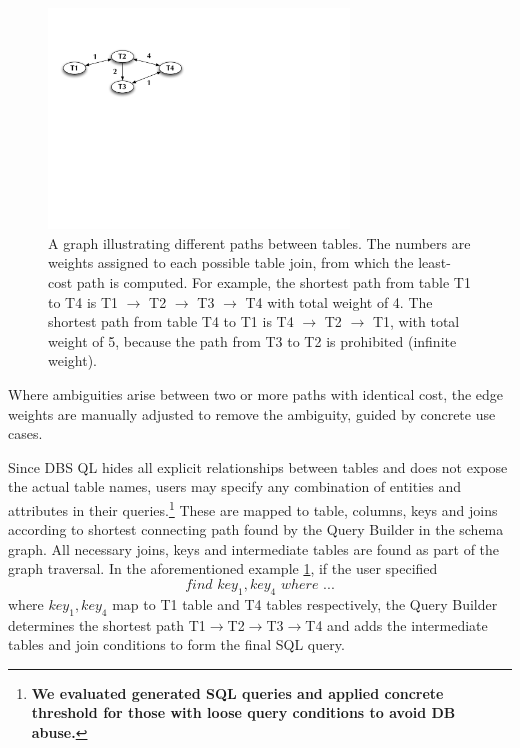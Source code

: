 \documentclass[a4paper]{jpconf}
\begin{document}
\begin{figure}[htb]
\centering
\includegraphics[width=80mm]{DBSSql_shortestpath.pdf}
\caption{A graph illustrating different paths between tables. The
numbers are weights assigned to each possible table join, from which the least-cost path
is computed. For example, the shortest path from table T1 to T4 is 
T1 $\rightarrow$ T2 $\rightarrow$ T3 $\rightarrow$ T4 with total weight 
of 4.  The shortest path from table T4 to T1 is 
T4 $\rightarrow$ T2 $\rightarrow$ T1, with total weight of 5, because the path
from T3 to T2 is prohibited (infinite weight).
}
\label{ShortestPath}
\end{figure}
Where ambiguities arise between two or more paths
with identical cost, the edge weights are manually adjusted to remove the
ambiguity, guided by concrete use cases. 

Since DBS QL hides all explicit relationships between tables and does not
expose the actual table names, users may
specify any combination of entities and attributes in their queries.\footnote{\bf
We evaluated generated SQL queries and applied concrete threshold for those
with loose query conditions to avoid DB abuse.}
These are mapped to table, columns, keys and joins according to
shortest connecting path found by the Query Builder in the schema graph.
All necessary joins, keys and intermediate tables are found as part of the
graph traversal.
In the aforementioned example \ref{ShortestPath},
if the user specified
$$find\,\, key_1, key_4\,\, where\,\, ...$$
where $key_1, key_4$ map to T1 table and T4 tables respectively,
the Query Builder determines
the shortest path 
T1$\rightarrow$T2$\rightarrow$T3$\rightarrow$T4 
and adds the intermediate tables 
and join conditions to form the final SQL query. 
\end{document}
